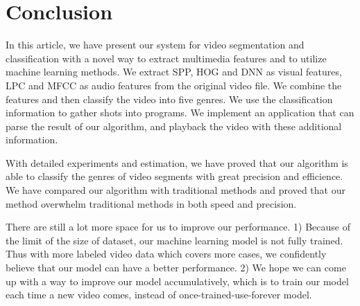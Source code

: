 \documentclass{article}
\begin{document}
\section{Conclusion}

In this article, we have present our system for video segmentation and classification with a novel way to extract multimedia features and to utilize machine learning methods. We extract SPP, HOG and DNN as visual features, LPC and MFCC as audio features from the original video file. We combine the features and then classify the video into five genres. We use the classification information to gather shots into programs. We implement an application that can parse the result of our algorithm, and playback the video with these additional information.

With detailed experiments and estimation, we have proved that our algorithm is able to classify the genres of video segments with great precision and efficience. We have compared our algorithm with traditional methods and proved that our method overwhelm traditional methods in both speed and precision. 

There are still a lot more space for us to improve our performance. 1) Because of the limit of the size of dataset, our machine learning model is not fully trained. Thus with more labeled video data which covers more cases, we confidently believe that our model can have a better performance. 2) We hope we can come up with a way to improve our model accumulatively, which is to train our model each time a new video comes, instead of once-trained-use-forever model.



\end{document}
